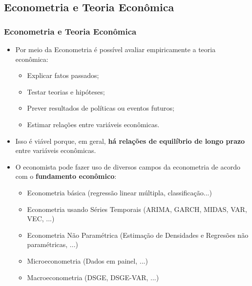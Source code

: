 \documentclass[pdf,9pt,xcolor=dvipsnames,hide notes]{beamer}\usepackage[]{graphicx}\usepackage[]{color}
\begin{document}
\subsection{Econometria e Teoria Econômica}
\begin{frame}\frametitle{Econometria e Teoria Econômica}
  \begin{itemize}
    \item Por meio da Econometria é possível avaliar empiricamente a teoria econômica:
    \begin{itemize}
      \item Explicar fatos passados;
      \item Testar teorias e hipóteses;
      \item Prever resultados de políticas ou eventos futuros;
      \item Estimar relações entre variáveis econômicas.
    \end{itemize}
    \item Isso é viável porque, em geral, \textbf{há relações de equilíbrio de longo prazo} entre variáveis econômicas.
  \end{itemize}
  \begin{itemize}
    \item O economista pode fazer uso de diversos campos da econometria de acordo com o \textbf{fundamento econômico}:
    \begin{itemize}
      \item Econometria básica (regressão linear múltipla, classificação...)
      \item Econometria usando Séries Temporais (ARIMA, GARCH, MIDAS, VAR, VEC, ...)
      \item Econometria Não Paramétrica (Estimação de Densidades e Regresões não paramétricas, ...)
      \item Microeconometria (Dados em painel, ...)
      \item Macroeconometria (DSGE, DSGE-VAR, ...)
    \end{itemize}
  \end{itemize}
\end{frame}
\end{document}
